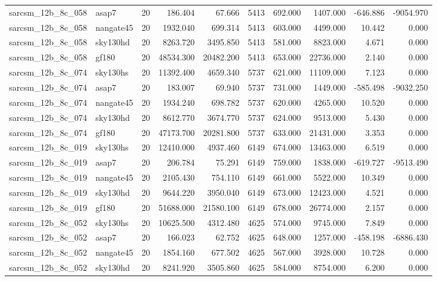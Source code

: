 \begin{tabular}{llrrrrrrrr}
sarcsm\_12b\_8c\_058 & asap7 & 20 & 186.404 & 67.666 & 5413 & 692.000 & 1407.000 & -646.886 & -9054.970 \\
sarcsm\_12b\_8c\_058 & nangate45 & 20 & 1932.040 & 699.314 & 5413 & 603.000 & 4499.000 & 10.442 & 0.000 \\
sarcsm\_12b\_8c\_058 & sky130hd & 20 & 8263.720 & 3495.850 & 5413 & 581.000 & 8823.000 & 4.671 & 0.000 \\
sarcsm\_12b\_8c\_058 & gf180 & 20 & 48534.300 & 20482.200 & 5413 & 653.000 & 22736.000 & 2.140 & 0.000 \\
sarcsm\_12b\_8c\_074 & sky130hs & 20 & 11392.400 & 4659.340 & 5737 & 621.000 & 11109.000 & 7.123 & 0.000 \\
sarcsm\_12b\_8c\_074 & asap7 & 20 & 183.007 & 69.940 & 5737 & 731.000 & 1449.000 & -585.498 & -9032.250 \\
sarcsm\_12b\_8c\_074 & nangate45 & 20 & 1934.240 & 698.782 & 5737 & 620.000 & 4265.000 & 10.520 & 0.000 \\
sarcsm\_12b\_8c\_074 & sky130hd & 20 & 8612.770 & 3674.770 & 5737 & 624.000 & 9513.000 & 5.430 & 0.000 \\
sarcsm\_12b\_8c\_074 & gf180 & 20 & 47173.700 & 20281.800 & 5737 & 633.000 & 21431.000 & 3.353 & 0.000 \\
sarcsm\_12b\_8c\_019 & sky130hs & 20 & 12410.000 & 4937.460 & 6149 & 674.000 & 13463.000 & 6.519 & 0.000 \\
sarcsm\_12b\_8c\_019 & asap7 & 20 & 206.784 & 75.291 & 6149 & 759.000 & 1838.000 & -619.727 & -9513.490 \\
sarcsm\_12b\_8c\_019 & nangate45 & 20 & 2105.430 & 754.110 & 6149 & 661.000 & 5522.000 & 10.349 & 0.000 \\
sarcsm\_12b\_8c\_019 & sky130hd & 20 & 9644.220 & 3950.040 & 6149 & 673.000 & 12423.000 & 4.521 & 0.000 \\
sarcsm\_12b\_8c\_019 & gf180 & 20 & 51688.000 & 21580.100 & 6149 & 678.000 & 26774.000 & 2.157 & 0.000 \\
sarcsm\_12b\_8c\_052 & sky130hs & 20 & 10625.500 & 4312.480 & 4625 & 574.000 & 9745.000 & 7.849 & 0.000 \\
sarcsm\_12b\_8c\_052 & asap7 & 20 & 166.023 & 62.752 & 4625 & 648.000 & 1257.000 & -458.198 & -6886.430 \\
sarcsm\_12b\_8c\_052 & nangate45 & 20 & 1854.160 & 677.502 & 4625 & 567.000 & 3928.000 & 10.728 & 0.000 \\
sarcsm\_12b\_8c\_052 & sky130hd & 20 & 8241.920 & 3505.860 & 4625 & 584.000 & 8754.000 & 6.200 & 0.000 \\

\end{tabular}
